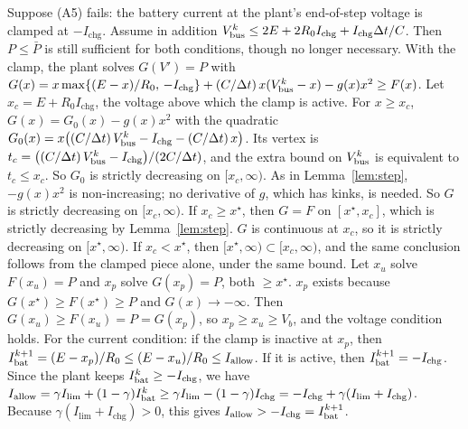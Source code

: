 \begin{remark}\label{rem:charge}
Suppose (A5) fails: the battery current at the plant's end-of-step voltage is clamped at $-I_{\mathrm{chg}}$. Assume in addition $V_{\mathrm{bus}}^k \le 2E + 2R_0 I_{\mathrm{chg}} + I_{\mathrm{chg}}\Delta t/C$. Then $P\le\bar P$ is still sufficient for both conditions, though no longer necessary.
With the clamp, the plant solves $G(V')=P$ with $G(x) = x\max\{(E-x)/R_0,\,-I_{\mathrm{chg}}\} + (C/\Delta t)\,x(V_{\mathrm{bus}}^k-x) - g(x)x^2 \ge F(x)$. Let $x_c = E+R_0I_{\mathrm{chg}}$, the voltage above which the clamp is active.
For $x\ge x_c$, $G(x) = G_0(x) - g(x)x^2$ with the quadratic $G_0(x) = x\bigl((C/\Delta t)\,V_{\mathrm{bus}}^k - I_{\mathrm{chg}} - (C/\Delta t)\,x\bigr)$. Its vertex is $t_c = \bigl((C/\Delta t)\,V_{\mathrm{bus}}^k - I_{\mathrm{chg}}\bigr)/(2C/\Delta t)$, and the extra bound on $V_{\mathrm{bus}}^k$ is equivalent to $t_c\le x_c$. So $G_0$ is strictly decreasing on $[x_c,\infty)$. As in Lemma~\ref{lem:step}, $-g(x)x^2$ is non-increasing; no derivative of $g$, which has kinks, is needed. So $G$ is strictly decreasing on $[x_c,\infty)$.
If $x_c\ge x^\star$, then $G=F$ on $[x^\star,x_c]$, which is strictly decreasing by Lemma~\ref{lem:step}. $G$ is continuous at $x_c$, so it is strictly decreasing on $[x^\star,\infty)$.
If $x_c<x^\star$, then $[x^\star,\infty)\subset[x_c,\infty)$, and the same conclusion follows from the clamped piece alone, under the same bound.
Let $x_u$ solve $F(x_u)=P$ and $x_p$ solve $G(x_p)=P$, both $\ge x^\star$. $x_p$ exists because $G(x^\star)\ge F(x^\star)\ge P$ and $G(x)\to-\infty$. Then $G(x_u)\ge F(x_u) = P = G(x_p)$, so $x_p\ge x_u\ge V_b$, and the voltage condition holds.
For the current condition: if the clamp is inactive at $x_p$, then $I_{\mathrm{bat}}^{k+1} = (E-x_p)/R_0 \le (E-x_u)/R_0 \le I_{\mathrm{allow}}$. If it is active, then $I_{\mathrm{bat}}^{k+1}=-I_{\mathrm{chg}}$. Since the plant keeps $I_{\mathrm{bat}}^k\ge -I_{\mathrm{chg}}$, we have $I_{\mathrm{allow}} = \gamma I_{\lim} + (1-\gamma)I_{\mathrm{bat}}^k \ge \gamma I_{\lim} - (1-\gamma)I_{\mathrm{chg}} = -I_{\mathrm{chg}} + \gamma(I_{\lim}+I_{\mathrm{chg}})$. Because $\gamma(I_{\lim}+I_{\mathrm{chg}})>0$, this gives $I_{\mathrm{allow}} > -I_{\mathrm{chg}} = I_{\mathrm{bat}}^{k+1}$.
\end{remark}

